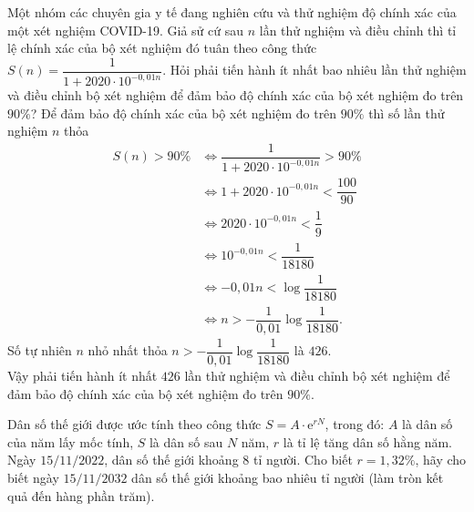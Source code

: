 \begin{ex}%
Một nhóm các chuyên gia y tế đang nghiên cứu và thử nghiệm độ chính xác của một xét nghiệm COVID-19. Giả sử cứ sau $n$ lần thử nghiệm và điều chỉnh thì tỉ lệ chính xác của bộ xét nghiệm đó tuân theo công thức $S(n)=\dfrac{1}{1+2020 \cdot 10^{-0{,}01n}}$. Hỏi phải tiến hành ít nhất bao nhiêu lần thử nghiệm và điều chỉnh bộ xét nghiệm để đảm bảo độ chính xác của bộ xét nghiệm đo trên $90\%$?
\shortans{}
\loigiai
{Để đảm bảo độ chính xác của bộ xét nghiệm đo trên $90\%$ thì số lần thử nghiệm $n$ thỏa
    \allowdisplaybreaks
    \begin{align*}
        S(n)>90\% &\Leftrightarrow\dfrac{1}{1+2020 \cdot 10^{-0{,}01n}}>90\%\\
        &\Leftrightarrow 1+2020 \cdot 10^{-0{,}01n} < \dfrac{100}{90}\\
        &\Leftrightarrow 2020 \cdot 10^{-0{,}01n} <\dfrac{1}{9}\\
        &\Leftrightarrow 10^{-0{,}01n}<\dfrac{1}{18180}\\
        &\Leftrightarrow -0{,}01n< \log \dfrac{1}{18180}\\
        &\Leftrightarrow n> -\dfrac{1}{0{,}01}\log \dfrac{1}{18180}.
    \end{align*}
    Số tự nhiên $n$ nhỏ nhất thỏa $n> -\dfrac{1}{0{,}01}\log \dfrac{1}{18180}$ là $426$.\\
    Vậy phải tiến hành ít nhất $426$ lần thử nghiệm và điều chỉnh bộ xét nghiệm để đảm bảo độ chính xác của bộ xét nghiệm đo trên $90\%$.
}
\end{ex}
\begin{ex}%
Dân số thế giới được ước tính theo công thức $S=A \cdot \mathrm{e}^{rN}$, trong đó: $A$ là dân số của năm lấy mốc tính, $S$ là dân số sau $N$ năm, $r$ là tỉ lệ tăng dân số hằng năm. Ngày $15/11/2022$, dân số thế giới khoảng $8$ tỉ người. Cho biết $r=1{,}32 \%$, hãy cho biết ngày $15 / 11 / 2032$ dân số thế giới khoảng bao nhiêu tỉ người (làm tròn kết quả đến hàng phần trăm).
\end{ex}
